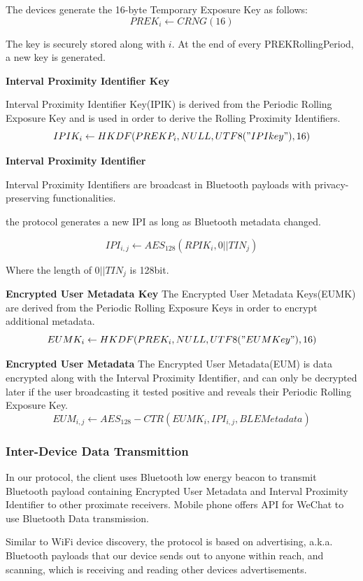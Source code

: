 \documentclass[11pt,en]{elegantpaper}
\begin{document}
The devices generate the 16-byte Temporary Exposure Key as follows: 
$$PREK_i\leftarrow CRNG(16)$$

The key is securely stored along with $i$. At the end of every PREKRollingPeriod, a new key is generated. 

\textbf{Interval Proximity Identifier Key}

Interval Proximity Identifier Key(IPIK) is derived from the Periodic Rolling Exposure Key and is used in
order to derive the Rolling Proximity Identifiers\cite{hirmer2020techniques}. 
$$IPIK_i\leftarrow HKDF(PREKP_i,NULL,UTF8("IPIkey"), 16)$$

\textbf{Interval Proximity Identifier}

Interval Proximity Identifiers are broadcast in Bluetooth payloads with privacy-preserving functionalities.

the protocol generates a new IPI as long as Bluetooth metadata changed.

$$IPI_{i,j}\leftarrow AES_{128}(RPIK_i,0||TIN_j)$$

Where the length of $0||TIN_j$ is 128bit.

\textbf{Encrypted User Metadata Key}
The Encrypted User Metadata Keys(EUMK) are derived from the Periodic Rolling Exposure Keys in order to encrypt additional metadata.
$$EUMK_i\leftarrow HKDF(PREK_i,NULL,UTF8("EUMKey"), 16)$$

\textbf{Encrypted User Metadata}
The Encrypted User Metadata(EUM) is data encrypted along with the Interval Proximity Identifier, and can only be decrypted later if the user broadcasting it tested positive and reveals their Periodic Rolling Exposure Key\cite{keselman2020homomorphic}. 
$$EUM_{i,j}\leftarrow AES_{128}-CTR(EUMK_i,IPI_{i,j},BLEMetadata)$$


\subsubsection{Inter-Device Data Transmittion}
In our protocol, the client uses Bluetooth low energy beacon to transmit Bluetooth payload containing Encrypted User Metadata and Interval Proximity Identifier to other proximate receivers. Mobile phone offers API for WeChat to use Bluetooth Data transmission.

Similar to WiFi device discovery, the protocol is based on advertising\cite{tang2020privacy}, a.k.a. Bluetooth payloads that our device sends out to anyone within reach, and scanning, which is receiving and reading other devices advertisements.
\end{document}
